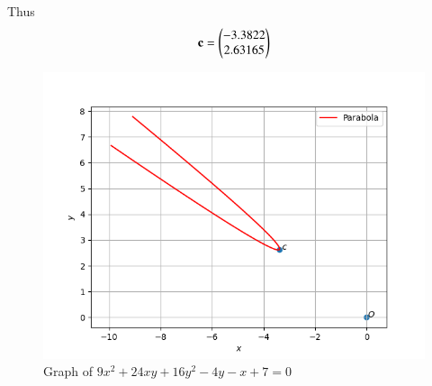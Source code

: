 \documentclass[journal,12pt,twocolumn]{IEEEtran}
\begin{document}
Thus
\begin{align}
    \mathbf{c} = \begin{pmatrix}-3.3822\\2.63165\end{pmatrix}
\end{align}
\renewcommand{\thefigure}{\arabic{figure}}
  \begin{figure}[!ht]
        \centering
        \includegraphics[width=\columnwidth]{parab.png}
        \caption{Graph of $9x^2+24xy+16y^2-4y-x+7=0$}
        \label{myfig}
\end{figure}
\end{document}
